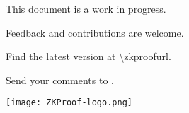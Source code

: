 \label{prelim:cover}
\begin{center}
\vspace*{5em}
{\bfseries\Huge\sffamily \zkpcomreftitle}

\vspace{1em} \scalebox{1.15}{\sffamily Version \zkpcomrefversion}
  
\vspace{2em}
\todayext


\vfill
This document is a work in progress.

Feedback and contributions are welcome.

Find the latest version at \url{\zkproofurl}.

Send your comments to \href{mailto:\zkpcomrefeditorsemail}{\zkpcomrefeditorsemail}.

\vfill

\texttt{[image: ZKProof-logo.png]}

\vspace{3em}

\end{center}
